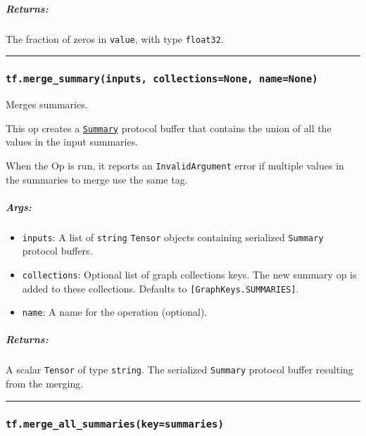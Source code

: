 \subparagraph{Returns: }\label{returns-24}

The fraction of zeros in \texttt{value}, with type \texttt{float32}.

\begin{center}\rule{0.5\linewidth}{\linethickness}\end{center}

\subsubsection{\texorpdfstring{\texttt{tf.merge\_summary(inputs,\ collections=None,\ name=None)}
}{tf.merge\_summary(inputs, collections=None, name=None) }}\label{tf.mergeux5fsummaryinputs-collectionsnone-namenone}

Merges summaries.

This op creates a
\href{https://tensorflow.googlesource.com/tensorflow/+/master/tensorflow/core/framework/summary.proto}{\texttt{Summary}}
protocol buffer that contains the union of all the values in the input
summaries.

When the Op is run, it reports an \texttt{InvalidArgument} error if
multiple values in the summaries to merge use the same tag.

\subparagraph{Args: }\label{args-34}

\begin{itemize}
\tightlist
\item
  \texttt{inputs}: A list of \texttt{string} \texttt{Tensor} objects
  containing serialized \texttt{Summary} protocol buffers.
\item
  \texttt{collections}: Optional list of graph collections keys. The new
  summary op is added to these collections. Defaults to
  \texttt{{[}GraphKeys.SUMMARIES{]}}.
\item
  \texttt{name}: A name for the operation (optional).
\end{itemize}

\subparagraph{Returns: }\label{returns-25}

A scalar \texttt{Tensor} of type \texttt{string}. The serialized
\texttt{Summary} protocol buffer resulting from the merging.

\begin{center}\rule{0.5\linewidth}{\linethickness}\end{center}

\subsubsection{\texorpdfstring{\texttt{tf.merge\_all\_summaries(key=\textquotesingle{}summaries\textquotesingle{})}
}{tf.merge\_all\_summaries(key='summaries') }}\label{tf.mergeux5fallux5fsummarieskeysummaries}

